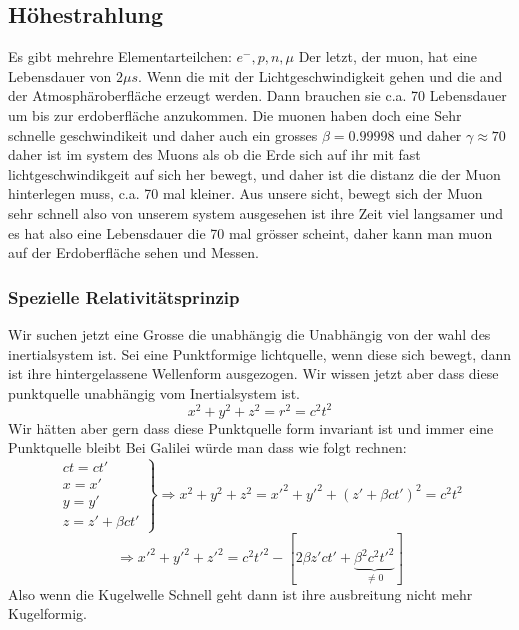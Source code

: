 \documentclass{article}
\begin{document}
\subsection{Höhestrahlung} Es gibt mehrehre Elementarteilchen: $e^{-},p,n,\mu$ Der letzt, der muon, hat eine Lebensdauer von $2\mu s$. Wenn die mit der Lichtgeschwindigkeit gehen und die and der Atmosphäroberfläche erzeugt werden. Dann brauchen sie c.a. 70 Lebensdauer
um bis zur erdoberfläche anzukommen. Die muonen haben doch eine Sehr schnelle geschwindikeit und daher auch ein grosses $\beta=0.99998$ und daher $\gamma\approx 70$ daher ist im system des Muons als ob die Erde sich auf ihr mit fast lichtgeschwindikgeit auf sich her bewegt, und daher ist die distanz die der Muon hinterlegen muss, c.a. 70 mal kleiner.
Aus unsere sicht, bewegt sich der Muon sehr schnell also von unserem system ausgesehen ist ihre Zeit viel langsamer und es hat also eine Lebensdauer die 70 mal grösser scheint, daher kann man muon auf der Erdoberfläche sehen und Messen.
\subsubsection{Spezielle Relativitätsprinzip}
Wir suchen jetzt eine Grosse die unabhängig die Unabhängig von der wahl des inertialsystem ist. Sei eine Punktformige lichtquelle, wenn diese sich bewegt, dann ist ihre hintergelassene Wellenform ausgezogen. Wir wissen jetzt aber dass diese punktquelle unabhängig vom Inertialsystem ist. \[x^2+y^2+z^2=r^2=c^2t^2\] Wir hätten aber gern dass diese Punktquelle form invariant ist und immer eine Punktquelle bleibt
Bei Galilei würde man dass wie folgt rechnen:
\[\left.\begin{matrix}ct=ct'\\x=x'\\y=y'\\z=z'+\beta ct'\end{matrix}\right\rbrace\Rightarrow x^2+y^2+z^2=x'^2+y'^2+(z'+\beta ct')^2=c^2t^2\]\[\Rightarrow x'^2+y'^2+z'^2=c^2t'^2-\left[2\beta z'ct'+\underset{\neq 0}{\underbrace{\beta^2c^2t'^2}}\right]\]
Also wenn die Kugelwelle Schnell geht dann ist ihre ausbreitung nicht mehr Kugelformig.
\end{document}

